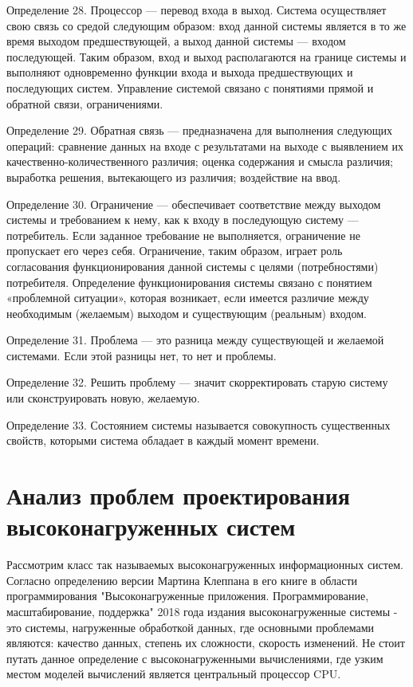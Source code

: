Определение 28. Процессор — перевод входа в выход.
Система осуществляет свою связь со средой следующим образом:
вход данной системы является в то же время выходом предшествующей, а выход данной системы — входом последующей. Таким образом, вход и выход располагаются на границе системы и выполняют одновременно функции входа и выхода предшествующих и последующих систем.
Управление системой связано с понятиями прямой и обратной связи, ограничениями.

Определение 29. Обратная связь — предназначена для выполнения следующих операций:
сравнение данных на входе с результатами на выходе с выявлением их качественно-количественного различия;
оценка содержания и смысла различия;
выработка решения, вытекающего из различия;
воздействие на ввод.

Определение 30. Ограничение — обеспечивает соответствие между выходом системы и требованием к нему, как к входу в последующую систему — потребитель. Если заданное требование не выполняется, ограничение не пропускает его через себя. Ограничение, таким образом, играет роль согласования функционирования данной системы с целями (потребностями) потребителя.
Определение функционирования системы связано с понятием «проблемной ситуации», которая возникает, если имеется различие между необходимым (желаемым) выходом и существующим (реальным) входом.

Определение 31. Проблема — это разница между существующей и желаемой системами. Если этой разницы нет, то нет и проблемы.

Определение 32. Решить проблему — значит скорректировать старую систему или сконструировать новую, желаемую.

Определение 33. Состоянием системы называется совокупность существенных свойств, которыми система обладает в каждый момент времени.

\section{Анализ проблем проектирования высоконагруженных систем}\label{sec:ch1/sec2}
Рассмотрим класс так называемых высоконагруженных информационных систем. Согласно определению версии Мартина Клеппана в его книге в области программирования "Высоконагруженные приложения. Программирование, масштабирование, поддержка" 2018 года издания высоконагруженные системы - это системы, нагруженные обработкой данных, где основными проблемами являются: качество данных, степень их сложности, скорость изменений. Не стоит путать данное определение с высоконагруженными вычислениями, где узким местом моделей вычислений является центральный процессор CPU.

